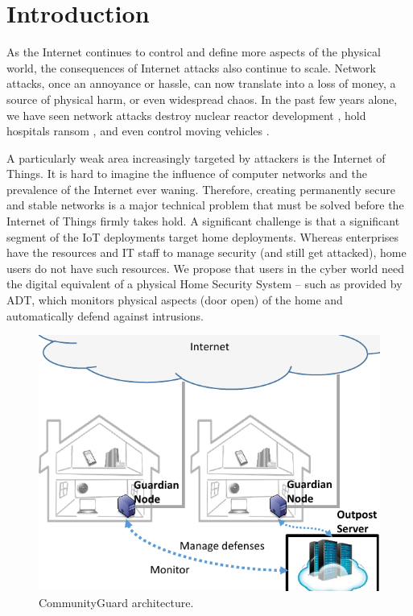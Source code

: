 \section{Introduction}
\label{sec:intro}

As the Internet continues to control and define more aspects of the physical world, the consequences of Internet attacks also continue to scale. Network attacks, once an annoyance or hassle, can now translate into a loss of money, a source of physical harm, or even widespread chaos. In the past few years alone, we have seen network attacks destroy nuclear reactor development \cite{stux}, hold hospitals ransom \cite{ransom}, and even control moving vehicles \cite{carhack}. 

A particularly weak area increasingly targeted by attackers is the Internet of Things. It is hard to imagine the influence of computer networks and the prevalence of the Internet ever waning. Therefore, creating permanently secure and stable networks is a major technical problem that must be solved before the Internet of Things firmly takes hold. A significant challenge is that a significant segment of the IoT deployments target home deployments.  Whereas enterprises have the resources and IT staff to manage security (and still get attacked), home users do not have such resources.  We propose that users in the cyber world need the digital equivalent of a physical Home Security System -- such as provided by ADT, which monitors physical aspects (\eg door open) of the home and automatically defend against intrusions. 



\begin{figure}
    \centering
    \includegraphics[width=0.95\columnwidth]{figs/highlevel.pdf}
    \caption{CommunityGuard architecture.}
    \label{fig:arch}
\end{figure}



